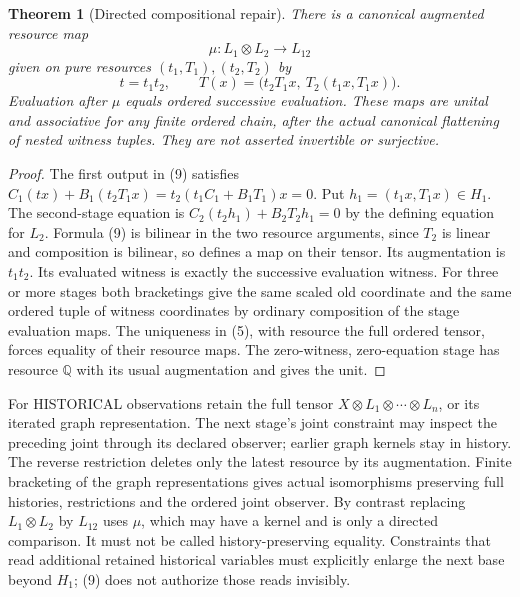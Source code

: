 \documentclass[11pt]{article}
\newtheorem{theorem}{Theorem}\newtheorem{proposition}{Proposition}\newtheorem{lemma}{Lemma}
\begin{document}
\begin{theorem}[Directed compositional repair]
There is a canonical augmented resource map
\[
 \mu:L_1\otimes L_2\to L_{12}
\]
given on pure resources $(t_1,T_1),(t_2,T_2)$ by
\[
 t=t_1t_2,\qquad
 T(x)=\big(t_2T_1x,\ T_2(t_1x,T_1x)\big).\tag{9}
\]
Evaluation after $\mu$ equals ordered successive evaluation. These maps are unital and associative for any finite ordered chain, after the actual canonical flattening of nested witness tuples. They are not asserted invertible or surjective.
\end{theorem}
\begin{proof}
The first output in (9) satisfies $C_1(tx)+B_1(t_2T_1x)=t_2(t_1C_1+B_1T_1)x=0$. Put $h_1=(t_1x,T_1x)\in H_1$. The second-stage equation is $C_2(t_2h_1)+B_2T_2h_1=0$ by the defining equation for $L_2$. Formula (9) is bilinear in the two resource arguments, since $T_2$ is linear and composition is bilinear, so defines a map on their tensor. Its augmentation is $t_1t_2$. Its evaluated witness is exactly the successive evaluation witness. For three or more stages both bracketings give the same scaled old coordinate and the same ordered tuple of witness coordinates by ordinary composition of the stage evaluation maps. The uniqueness in (5), with resource the full ordered tensor, forces equality of their resource maps. The zero-witness, zero-equation stage has resource $\mathbb Q$ with its usual augmentation and gives the unit.
\end{proof}

For HISTORICAL observations retain the full tensor $X\otimes L_1\otimes\cdots\otimes L_n$, or its iterated graph representation. The next stage's joint constraint may inspect the preceding joint through its declared observer; earlier graph kernels stay in history. The reverse restriction deletes only the latest resource by its augmentation. Finite bracketing of the graph representations gives actual isomorphisms preserving full histories, restrictions and the ordered joint observer. By contrast replacing $L_1\otimes L_2$ by $L_{12}$ uses $\mu$, which may have a kernel and is only a directed comparison. It must not be called history-preserving equality. Constraints that read additional retained historical variables must explicitly enlarge the next base beyond $H_1$; (9) does not authorize those reads invisibly.
\end{document}
